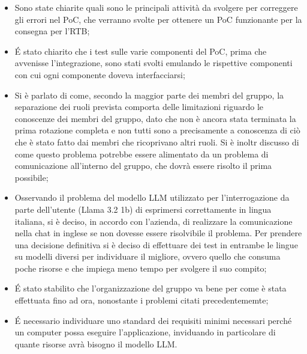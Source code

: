 \begin{itemize}
\begin{itemize}
        \item Sono state chiarite quali sono le principali attività da svolgere per correggere gli errori nel PoC, che verranno svolte per ottenere un PoC funzionante per la consegna per l'RTB;
        \item \'E stato chiarito che i test sulle varie componenti del PoC, prima che avvenisse l'integrazione, sono stati svolti emulando le rispettive componenti con cui ogni componente doveva interfacciarsi;
        \item Si è parlato di come, secondo la maggior parte dei membri del gruppo, la separazione dei ruoli prevista comporta delle limitazioni riguardo le conoscenze dei membri del gruppo, dato che non è ancora stata terminata la prima rotazione completa e non tutti sono a precisamente a conoscenza di ciò che è stato fatto dai membri che ricoprivano altri ruoli. Si è inoltr discusso di come questo problema potrebbe essere alimentato da un problema di comunicazione all'interno del gruppo, che dovrà essere risolto il prima possibile;
        \item Osservando il problema del modello LLM utilizzato per l'interrogazione da parte dell'utente (Llama 3.2 1b) di esprimersi correttamente in lingua italiana, si è deciso, in accordo con l'azienda, di realizzare la comunicazione nella chat in inglese se non dovesse essere risolvibile il problema. Per prendere una decisione definitiva si è deciso di effettuare dei test in entrambe le lingue su modelli diversi per individuare il migliore, ovvero quello che consuma poche risorse e che impiega meno tempo per svolgere il suo compito;
        \item \'E stato stabilito che l'organizzazione del gruppo va bene per come è stata effettuata fino ad ora, nonostante i problemi citati precedentememte;
        \item  \'E necessario individuare uno standard dei requisiti minimi necessari perché un computer possa eseguire l'applicazione, inviduando in particolare di quante risorse avrà bisogno il modello LLM.
    \end{itemize}
\end{itemize}